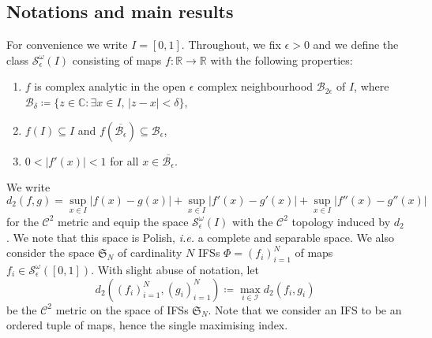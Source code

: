 \documentclass[11pt,a4paper]{article}
\theoremstyle{definition}
\theoremstyle{remark}
\newcommand{\0}{\mathbf{0}}
\newcommand{\ie}{{\it i.e.}\/ }
\numberwithin{equation}{section}
\begin{document}
\subsection{Notations and main results}
For convenience we write $I=[0,1]$.
Throughout, we fix $\epsilon>0$ and  we define the class $\mathcal{S}^\omega_\epsilon(I)$
consisting of maps $f:\mathbb{R}\to\mathbb{R}$ with the following properties:
\begin{enumerate}[label=(\Alph*)]
  \item\label{it:a} $f$ is complex analytic in the open $\epsilon$ complex neighbourhood
    $\mathcal{B}_{2\epsilon}$ of  $I$, where $\mathcal{B}_{\delta}\coloneqq\{z\in\mathbb{C}:\exists
    x\in I,\, |z-x|<\delta\}$,
  \item\label{it:b} $f(I) \subseteq I$ and $f(\overline{\mathcal{B}_{\epsilon}}) \subseteq
    \mathcal{B}_{\epsilon}$,
  \item\label{it:c} $0<|f'(x)|<1$ for all $x\in\overline{\mathcal{B}_{\epsilon}}$.
\end{enumerate}
We write
\[
  d_2(f,g) = \sup_{x\in I} |f(x)-g(x)|+\sup_{x\in I} |f'(x)-g'(x)| +\sup_{x\in I} |f''(x)-g''(x)|
\]
for the $\mathcal{C}^2$ metric and equip the space $\mathcal{S}^\omega_\epsilon(I)$ with the
$\mathcal{C}^2$ topology induced by $d_2$. We note that this space is Polish, \ie a complete
and separable space.
We also consider the space $\mathfrak{S}_N$ of cardinality $N$ IFSs $\Phi=(f_i)_{i=1}^N$ of maps $f_i\in
\mathcal{S}^\omega_\epsilon([0,1])$. With slight abuse of notation, let
$$
d_2((f_i)_{i=1}^N,(g_i)_{i=1}^N)\coloneqq\max_{i\in\mathcal{I}}d_2(f_i,g_i)
$$
be the $\mathcal{C}^2$ metric on the space of IFSs $\mathfrak{S}_N$. Note that we consider an IFS to
be an ordered tuple of maps, hence the single maximising index.
\end{document}
